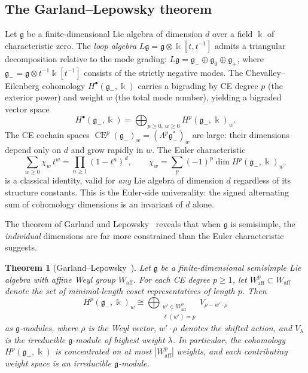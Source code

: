 \documentclass[11pt,reqno]{amsart}
\theoremstyle{plain}
\newtheorem{theorem}{Theorem}[section]
\theoremstyle{definition}
\theoremstyle{remark}
\DeclareMathOperator{\CE}{CE}
\newcommand{\fg}{\mathfrak{g}}
\newcommand{\Waff}{W_{\mathrm{aff}}}
\newcommand{\gminus}{\fg_{-}}
\newcommand{\kk}{\Bbbk}
\begin{document}
\subsection{The Garland--Lepowsky theorem}

Let $\fg$ be a finite-dimensional Lie algebra of dimension $d$ over a field
$\kk$ of characteristic zero. The \emph{loop algebra} $L\fg = \fg \otimes
\kk[t, t^{-1}]$ admits a triangular decomposition relative to the mode
grading: $L\fg = \gminus \oplus \fg_0 \oplus \fg_+$, where
$\gminus = \fg \otimes t^{-1}\kk[t^{-1}]$ consists of the strictly
negative modes. The Chevalley--Eilenberg cohomology
$H^{\bullet}(\gminus, \kk)$ carries a bigrading by CE degree $p$ (the
exterior power) and weight $w$ (the total mode number), yielding a
bigraded vector space
\[
 H^{\bullet}(\gminus, \kk) = \bigoplus_{p \ge 0, \, w \ge 0} H^p(\gminus, \kk)_w.
\]
The CE cochain spaces $\CE^p(\gminus)_w = (\Lambda^p \gminus^*)_w$ are large:
their dimensions depend only on $d$ and grow rapidly in $w$. The Euler
characteristic
\begin{equation}\label{eq:euler-product}
 \sum_{w \ge 0} \chi_w \, t^w = \prod_{n \ge 1} (1 - t^n)^d, \qquad
 \chi_w = \sum_p (-1)^p \dim H^p(\gminus, \kk)_w,
\end{equation}
is a classical identity, valid for \emph{any} Lie algebra of dimension $d$
regardless of its structure constants. This is the Euler-side universality:
the signed alternating sum of cohomology dimensions is an invariant of $d$
alone.

The theorem of Garland and Lepowsky~\cite{GL76} reveals that when $\fg$ is
semisimple, the \emph{individual} dimensions are far more constrained than the
Euler characteristic suggests.

\begin{theorem}[Garland--Lepowsky~\cite{GL76}]\label{thm:GL}
 Let $\fg$ be a finite-dimensional semisimple Lie algebra with affine Weyl
 group $\Waff$. For each CE degree $p \ge 1$, let $\Waff^p \subset \Waff$
 denote the set of minimal-length coset representatives of length $p$. Then
 \[
 H^p(\gminus, \kk)_w \cong \bigoplus_{\substack{w' \in \Waff^p \\ \ell(w') = p}}
 V_{\rho - w'\!\cdot\!\rho}
 \]
 as $\fg$-modules, where $\rho$ is the Weyl vector, $w'\!\cdot\!\rho$ denotes
 the shifted action, and $V_\lambda$ is the irreducible $\fg$-module of
 highest weight $\lambda$. In particular, the cohomology $H^p(\gminus, \kk)$
 is concentrated on at most $|\Waff^p|$ weights, and each contributing
 weight space is an irreducible $\fg$-module.
\end{theorem}
\end{document}
